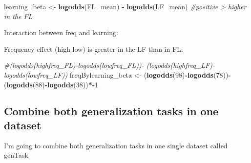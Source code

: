 \documentclass[
]{article}
\newenvironment{Shaded}{\begin{snugshade}}{\end{snugshade}}
\newcommand{\CommentTok}[1]{\textcolor[rgb]{0.56,0.35,0.01}{\textit{#1}}}
\newcommand{\DecValTok}[1]{\textcolor[rgb]{0.00,0.00,0.81}{#1}}
\newcommand{\KeywordTok}[1]{\textcolor[rgb]{0.13,0.29,0.53}{\textbf{#1}}}
\newcommand{\NormalTok}[1]{#1}
\newcommand{\OperatorTok}[1]{\textcolor[rgb]{0.81,0.36,0.00}{\textbf{#1}}}
\newcommand{\StringTok}[1]{\textcolor[rgb]{0.31,0.60,0.02}{#1}}
\begin{document}
\begin{Shaded}
\begin{Highlighting}[]
\NormalTok{learning_beta <-}\StringTok{ }\KeywordTok{logodds}\NormalTok{(FL_mean) }\OperatorTok{-}\StringTok{ }\KeywordTok{logodds}\NormalTok{(LF_mean)}
\CommentTok{#positive > higher in the FL}
\end{Highlighting}
\end{Shaded}

Interaction between freq and learning:

Frequency effect (high-low) is greater in the LF than in FL:

\begin{Shaded}
\begin{Highlighting}[]
\CommentTok{#(logodds(highfreq_FL)-logodds(lowfreq_FL))- (logodds(highfreq_LF)-logodds(lowfreq_LF))}
\NormalTok{freqBylearning_beta <-}\StringTok{ }\NormalTok{(}\KeywordTok{logodds}\NormalTok{(}\DecValTok{98}\NormalTok{)}\OperatorTok{-}\KeywordTok{logodds}\NormalTok{(}\DecValTok{78}\NormalTok{))}\OperatorTok{-}\StringTok{ }\NormalTok{(}\KeywordTok{logodds}\NormalTok{(}\DecValTok{88}\NormalTok{)}\OperatorTok{-}\KeywordTok{logodds}\NormalTok{(}\DecValTok{38}\NormalTok{))}\OperatorTok{*-}\DecValTok{1}
\end{Highlighting}
\end{Shaded}

\hypertarget{combine-both-generalization-tasks-in-one-dataset}{%
\subsection{Combine both generalization tasks in one
dataset}\label{combine-both-generalization-tasks-in-one-dataset}}

I'm going to combine both generalization tasks in one single dataset
called genTask
\end{document}
